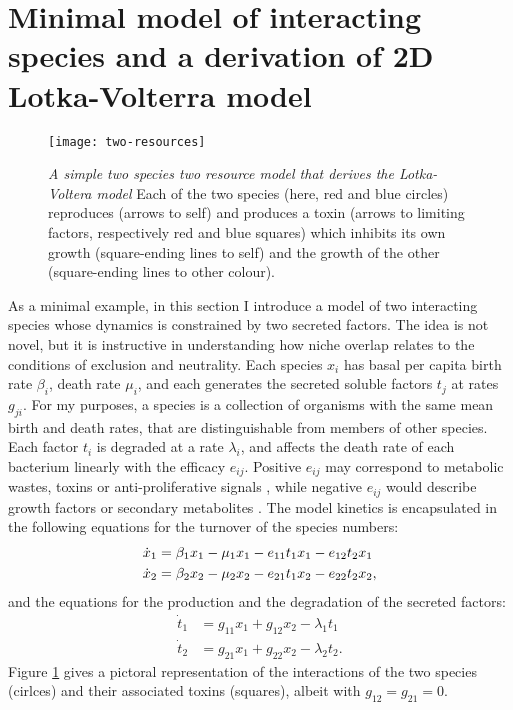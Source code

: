 \section{Minimal model of interacting species and a derivation of 2D Lotka-Volterra model} %
\begin{figure}[h]
	\centering
	\texttt{[image: two-resources]}
	\caption{\emph{A simple two species two resource model that derives the Lotka-Voltera model} Each of the two species (here, red and blue circles) reproduces (arrows to self) and produces a toxin (arrows to limiting factors, respectively red and blue squares) which inhibits its own growth (square-ending lines to self) and the growth of the other (square-ending lines to other colour). } \label{toxinsfig}
\end{figure}%

As a minimal example, in this section I introduce a model of two interacting species whose dynamics is constrained by two secreted factors. 
The idea is not novel, but it is instructive in understanding how niche overlap relates to the conditions of exclusion and neutrality. 
Each species $x_i$ has basal per capita birth rate $\beta_i$, death rate $\mu_i$, and each generates the secreted soluble factors $t_j$ at rates $g_{ji}$. 
For my purposes, a species is a collection of organisms with the same mean birth and death rates, that are distinguishable from members of other species. 
Each factor $t_i$ is degraded at a rate $\lambda_i$, and affects the death rate of each bacterium linearly with the efficacy $e_{ij}$. 
Positive $e_{ij}$ may correspond to metabolic wastes, toxins or anti-proliferative signals \cite{Jacob1989,Maplestone1992,VanMelderen2009,Rankin2012,Shen2015,Wynn2015}, while negative $e_{ij}$ would describe growth factors or secondary metabolites \cite{Maplestone1992,Reya2001,Wink2003}. 
The model kinetics is encapsulated in the following equations for the turnover of the species numbers:
\begin{align}
\dot{x}_1 &= \beta_1 x_1 - \mu_1 x_1 - e_{11} t_1 x_1 - e_{12} t_2 x_1 \notag \\
\dot{x}_2 &= \beta_2 x_2 - \mu_2 x_2 - e_{21} t_1 x_2 - e_{22} t_2 x_2 \label{eq-x-tox},
\end{align}
and the equations for the production and the degradation of the secreted factors:
\begin{align}
\dot{t}_1 &= g_{11} x_1 + g_{12}x_2 - \lambda_1 t_1  \nonumber \\
\dot{t}_2 &= g_{21} x_1 + g_{22}x_2 - \lambda_2 t_2. \label{eq-tox}
\end{align}
Figure \ref{toxinsfig} gives a pictoral representation of the interactions of the two species (cirlces) and their associated toxins (squares), albeit with $g_{12}=g_{21}=0$. 

